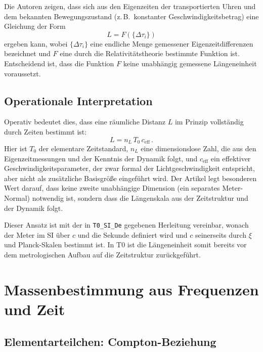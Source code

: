Die Autoren zeigen, dass sich aus den Eigenzeiten der transportierten Uhren und
dem bekannten Bewegungszustand (z.\,B.\ konstanter Geschwindigkeitsbetrag)
eine Gleichung der Form
\begin{equation}
  L = F\left(\{\Delta \tau_i\}\right)
\end{equation}
ergeben kann, wobei $\{\Delta \tau_i\}$ eine endliche Menge gemessener
Eigenzeitdifferenzen bezeichnet und $F$ eine durch die Relativitätstheorie
bestimmte Funktion ist. Entscheidend ist, dass die Funktion $F$ keine
unabhängig gemessene Längeneinheit voraussetzt.

\subsection{Operationale Interpretation}

Operativ bedeutet dies, dass eine räumliche Distanz $L$ im Prinzip vollständig
durch Zeiten bestimmt ist:
\begin{equation}
  L = n_L \, T_0 \, c_{\text{eff}} \, .
\end{equation}
Hier ist $T_0$ der elementare Zeitstandard, $n_L$ eine dimensionslose Zahl, die
aus den Eigenzeitmessungen und der Kenntnis der Dynamik folgt, und
$c_{\text{eff}}$ ein effektiver Geschwindigkeitsparameter, der zwar formal der
Lichtgeschwindigkeit entspricht, aber nicht als zusätzliche Basisgröße
eingeführt wird. Der Artikel legt besonderen Wert darauf, dass keine zweite
unabhängige Dimension (ein separates Meter-Normal) notwendig ist, sondern dass
die Längenskala aus der Zeitstruktur und der Dynamik folgt.

Dieser Ansatz ist mit der in \texttt{T0\_SI\_De} gegebenen Herleitung
vereinbar, wonach der Meter im SI über $c$ und die Sekunde definiert wird und
$c$ seinerseits durch $\xi$ und Planck-Skalen bestimmt ist. In T0 ist die
Längeneinheit somit bereits vor dem metrologischen Aufbau auf die Zeitstruktur
zurückgeführt.

\section{Massenbestimmung aus Frequenzen und Zeit}
\label{sec:massenbestimmung}

\subsection{Elementarteilchen: Compton-Beziehung}

